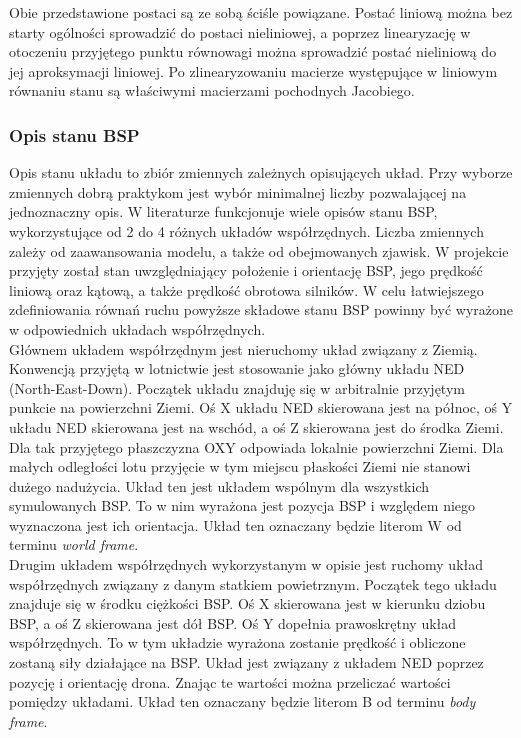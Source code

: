 Obie przedstawione postaci są ze sobą ściśle powiązane. Postać liniową można bez starty ogólności sprowadzić do postaci nieliniowej, a poprzez linearyzację w otoczeniu przyjętego punktu równowagi można sprowadzić postać nieliniową do jej aproksymacji liniowej. Po zlinearyzowaniu macierze występujące w liniowym równaniu stanu są właściwymi macierzami pochodnych Jacobiego.

\subsubsection{Opis stanu BSP}

Opis stanu układu to zbiór zmiennych zależnych opisujących układ. Przy wyborze zmiennych dobrą praktykom jest wybór minimalnej liczby pozwalającej na jednoznaczny opis. W literaturze funkcjonuje wiele opisów stanu BSP, wykorzystujące od 2 do 4 różnych układów współrzędnych. Liczba zmiennych zależy od zaawansowania modelu, a także od obejmowanych zjawisk. W projekcie przyjęty został stan uwzględniający położenie i orientację BSP, jego prędkość liniową oraz kątową, a także prędkość obrotowa silników. W celu łatwiejszego zdefiniowania równań ruchu powyższe składowe stanu BSP powinny być wyrażone w odpowiednich układach współrzędnych.\\

Głównem układem współrzędnym jest nieruchomy układ związany z Ziemią. Konwencją przyjętą w lotnictwie jest stosowanie jako główny układu NED (North-East-Down). Początek układu znajduję się w arbitralnie przyjętym punkcie na powierzchni Ziemi. Oś X układu NED skierowana jest na północ, oś Y układu NED skierowana jest na wschód, a oś Z skierowana jest do środka Ziemi. Dla tak przyjętego płaszczyzna OXY odpowiada lokalnie powierzchni Ziemi. Dla małych odległości lotu przyjęcie w tym miejscu płaskości Ziemi nie stanowi dużego nadużycia. Układ ten jest układem wspólnym dla wszystkich symulowanych BSP. To w nim wyrażona jest pozycja BSP i względem niego wyznaczona jest ich orientacja. Układ ten oznaczany będzie literom W od terminu \textit{world frame}.\\

Drugim układem współrzędnych wykorzystanym w opisie jest ruchomy układ współrzędnych związany z danym statkiem powietrznym. Początek tego układu znajduje się w środku ciężkości BSP. Oś X skierowana jest w kierunku dziobu BSP, a oś Z skierowana jest dół BSP. Oś Y dopełnia prawoskrętny układ współrzędnych. To w tym układzie wyrażona zostanie prędkość i obliczone zostaną siły działające na BSP. Układ jest związany z układem NED poprzez pozycję i orientację drona. Znając te wartości można przeliczać wartości pomiędzy układami.  Układ ten oznaczany będzie literom B od terminu \textit{body frame}.

